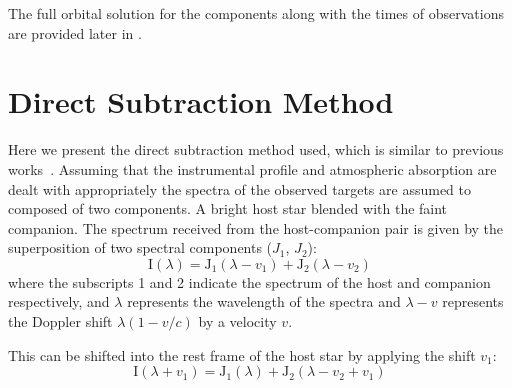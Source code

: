 

The full orbital solution for the components along with the times of observations are provided later in .


\section{Direct Subtraction Method}
\label{sec:direct-subtraction}
Here we present the direct subtraction method used, which is similar to previous works~\citep{ferluga_separating_1997,kostogryz_spectral_2013}. Assuming that the instrumental profile and atmospheric absorption are dealt with appropriately the spectra of the observed targets are assumed to composed of two components. A bright host star blended with the faint companion. The spectrum received from the host-companion pair is given by the superposition of two spectral components (\(J_{1}\), \(J_{2}\)):
\begin{equation}
\textrm{I}(\lambda) = \textrm{J}_{1}(\lambda - v_{1}) + \textrm{J}_{2}(\lambda - v_{2})
\end{equation}
where the subscripts 1 and 2 indicate the spectrum of the host and companion respectively, and \(\lambda\) represents the wavelength of the spectra and \(\lambda-v\) represents the Doppler shift \(\lambda(1-v/c)\) by a velocity \(v\).

This can be shifted into the rest frame of the host star by applying the shift \(v_1\):
\begin{equation}
\textrm{I}(\lambda + v_{1}) = \textrm{J}_{1}(\lambda) + \textrm{J}_{2}(\lambda - v_{2} + v_{1})
\end{equation}

